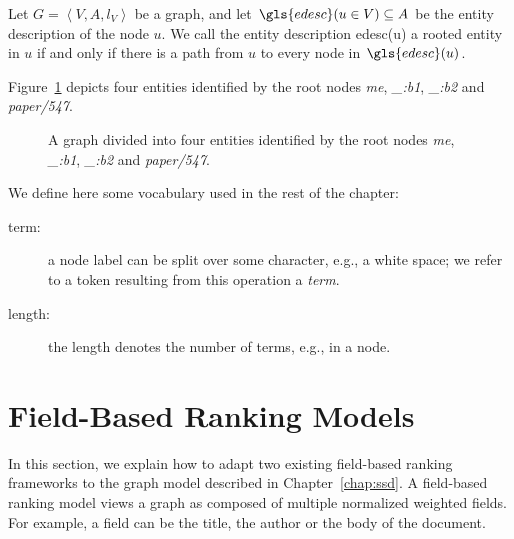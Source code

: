 \begin{definition}
Let $G = \left\langle V, A, l_V \right\rangle$ be a graph, and let $\gls{edesc}(u \in V) \subseteq A$ be the entity description of the node $u$. We call the entity description \gls{edesc}(u) a rooted entity in $u$ if and only if there is a path from $u$ to every node in $\gls{edesc}(u)$.
\end{definition}

Figure~\ref{fig:entities} depicts four entities identified by the root nodes \emph{me}, \emph{\_:b1}, \emph{\_:b2} and \emph{paper/547}.

\begin{figure}
	\centering
	\caption{A graph divided into four entities identified by the root nodes \emph{me}, \emph{\_:b1}, \emph{\_:b2} and \emph{paper/547}.}
	\label{fig:entities}
\end{figure}

We define here some vocabulary used in the rest of the chapter:
\begin{description}
	\item[term:] a node label can be split over some character, e.g., a white space; we refer to a token resulting from this operation a \emph{term}.
	\item[length:] the length denotes the number of terms, e.g., in a node.
\end{description}

\section{Field-Based Ranking Models}
\label{sec:ranking-wod}

In this section, we explain how to adapt two existing field-based ranking frameworks to the graph model described in Chapter~\ref{chap:ssd}.
A field-based ranking model views a graph as composed of multiple normalized weighted fields. For example, a field can be the title, the author or the body of the document.\\

